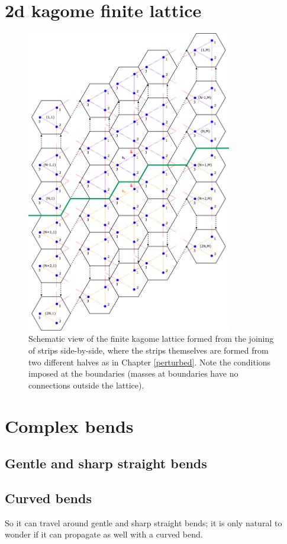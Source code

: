 \section{2d kagome finite lattice}
\begin{figure}[!h]
\centering
\includegraphics[width=0.8\textwidth]{imgs/kagomefinitemodel.png}
\caption{\label{fig:kagomeM} Schematic view of the finite kagome lattice formed
  from the joining of strips side-by-side, where the strips themselves are
  formed from two different halves as in Chapter \ref{perturbed}. Note the
  conditions imposed at the boundaries (masses at boundaries have no
  connections outside the lattice).}
\end{figure}

\section{Complex bends}
\label{complexbends}

\subsection{Gentle and sharp straight bends}

\subsection{Curved bends}
So it can travel around gentle and sharp straight bends; it is only natural to
wonder if it can propagate as well with a curved bend.


